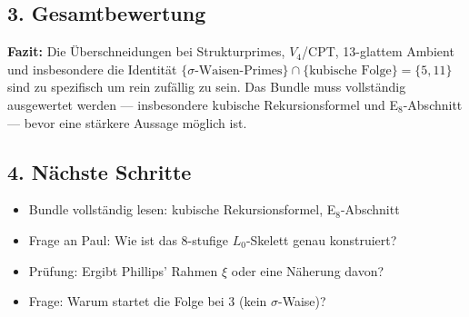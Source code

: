 \subsection*{3. Gesamtbewertung}

\begin{center}
\end{center}

\begin{mdframed}[style=info]
\textbf{Fazit:} Die Überschneidungen bei Strukturprimes, $V_4$/CPT,
13-glattem Ambient und insbesondere die Identität
$\{\sigma\text{-Waisen-Primes}\} \cap \{\text{kubische Folge}\} = \{5, 11\}$
sind zu spezifisch um rein zufällig zu sein. Das Bundle muss vollständig
ausgewertet werden — insbesondere kubische Rekursionsformel und
E$_8$-Abschnitt — bevor eine stärkere Aussage möglich ist.
\end{mdframed}

\subsection*{4. Nächste Schritte}

\begin{itemize}
\item Bundle vollständig lesen: kubische Rekursionsformel, E$_8$-Abschnitt
\item Frage an Paul: Wie ist das 8-stufige $L_0$-Skelett genau konstruiert?
\item Prüfung: Ergibt Phillips' Rahmen $\xi$ oder eine Näherung davon?
\item Frage: Warum startet die Folge bei $3$ (kein $\sigma$-Waise)?
\end{itemize}
